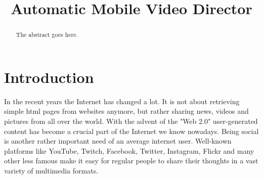 \documentclass[conference]{IEEEtran}
\begin{document}
\title{Automatic Mobile Video Director}

\author{
\and
\and
\and
}


\maketitle

\begin{abstract}
The abstract goes here.
\end{abstract}

\section{Introduction}

In the recent years the Internet has changed a lot. 
It is not about retrieving simple html pages from websites anymore, 
but rather sharing news, videos and pictures from all over the world.
With the advent of the "Web 2.0" user-generated content has become a crucial part of the Internet we know nowadays.
Being social is another rather important need of an average internet user.
Well-known platforms like YouTube, Twitch, Facebook, Twitter, Instagram, Flickr and many other less famous
make it easy for regular people to share their thoughts in a vast variety of multimedia formats.
\end{document}
